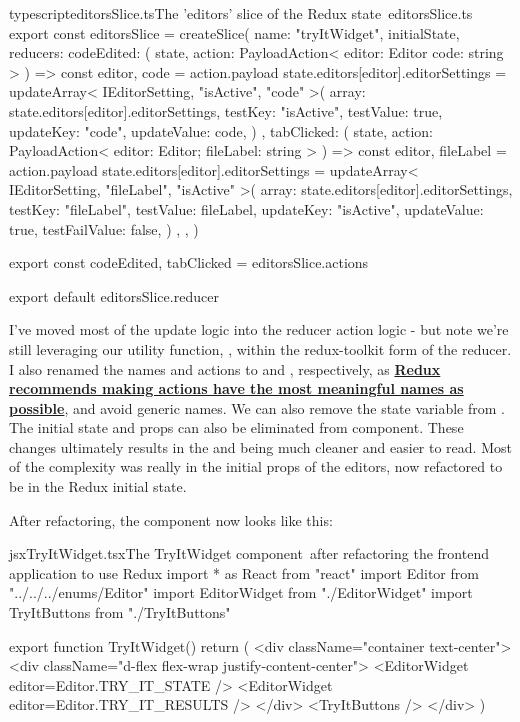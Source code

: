 \documentclass[paper=6in:9in,pagesize=pdftex,headinclude=on,footinclude=on,12pt,twoside]{scrbook}
\newcommand{\link}[2]{\textbf{\textcolor{monokaiPink}{\href{#2}{#1}}}}
\begin{document}
\begin{codeInput}{typescript}{editorsSlice.ts}{The 'editors' slice of the Redux state\, editorsSlice.ts}
export const editorsSlice = createSlice({
  name: "tryItWidget",
  initialState,
  reducers: {
    codeEdited: (
      state,
      action: PayloadAction<{
        editor: Editor
        code: string
      }>
    ) => {
      const { editor, code } = action.payload
      state.editors[editor].editorSettings = updateArray<
        IEditorSetting,
        "isActive",
        "code"
      >({
        array: state.editors[editor].editorSettings,
        testKey: "isActive",
        testValue: true,
        updateKey: "code",
        updateValue: code,
      })
    },
    tabClicked: (
      state,
      action: PayloadAction<{ editor: Editor; fileLabel: string }>
    ) => {
      const { editor, fileLabel } = action.payload
      state.editors[editor].editorSettings = updateArray<
        IEditorSetting,
        "fileLabel",
        "isActive"
      >({
        array: state.editors[editor].editorSettings,
        testKey: "fileLabel",
        testValue: fileLabel,
        updateKey: "isActive",
        updateValue: true,
        testFailValue: false,
      })
    },
  },
})

export const { codeEdited, tabClicked } = editorsSlice.actions

export default editorsSlice.reducer  
\end{codeInput}

I've moved most of the  update logic into the reducer action logic - but note we're still leveraging our utility function, , within the redux-toolkit form of the reducer. I also renamed the names  and  actions to  and , respectively, as \link{Redux recommends making actions have the most meaningful names as possible}{https://redux.js.org/style-guide/style-guide\#write-meaningful-action-names}, and avoid generic names. We can also remove the state variable from . The initial state and props can also be eliminated from  component. These changes ultimately results in the  and  being much cleaner and easier to read. Most of the complexity was really in the initial props of the editors, now refactored to be in the Redux initial state.

After refactoring, the  component now looks like this:

\begin{codeInput}{jsx}{TryItWidget.tsx}{The TryItWidget component\, after refactoring the frontend application to use Redux}
import * as React from "react"
import Editor from "../../../enums/Editor"
import { EditorWidget } from "./EditorWidget"
import { TryItButtons } from "./TryItButtons"

export function TryItWidget() {
  return (
    <div className="container text-center">
      <div className="d-flex flex-wrap justify-content-center">
        <EditorWidget editor={Editor.TRY_IT_STATE} />
        <EditorWidget editor={Editor.TRY_IT_RESULTS} />
      </div>
      <TryItButtons />
    </div>
  )
}
\end{codeInput}
\end{document}
